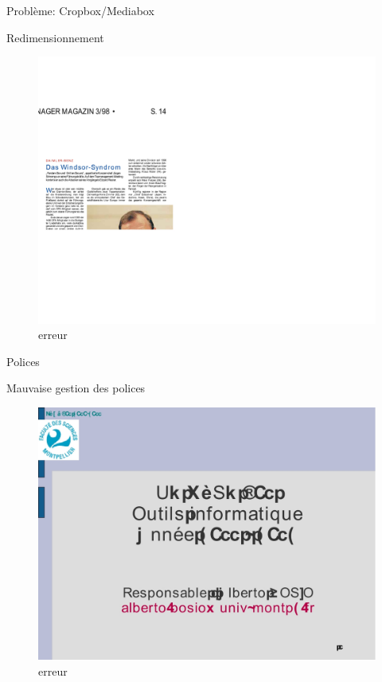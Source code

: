 \begin{frame}{Problème: Cropbox/Mediabox}
	\begin{block}{Redimensionnement}
		\begin{figure}[h]
        		\begin{center}
         		\includegraphics[scale=0.08]{images/fail1.jpg} 
        		\end{center}
        		\caption{erreur}
        		\label{erreur}
    		\end{figure}
	\end{block}
\end{frame}

\begin{frame}{Polices}
	\begin{block}{Mauvaise gestion des polices}
		\begin{figure}[h]
        		\begin{center}
         		\includegraphics[scale=0.17]{images/fail2.jpg} 
        		\end{center}
        		\caption{erreur}
        		\label{erreur}
    		\end{figure}
	\end{block}
\end{frame}
